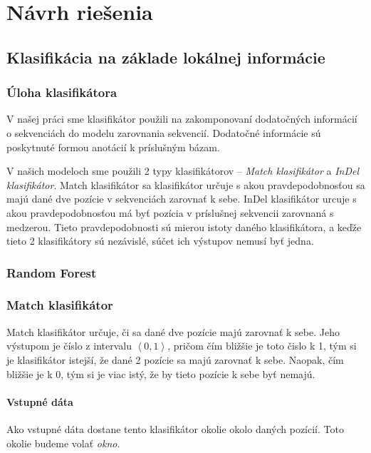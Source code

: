 \chapter{Návrh riešenia}
\section[Klasifikácia]{Klasifikácia na základe lokálnej informácie}

\subsection{Úloha klasifikátora}

V našej práci sme klasifikátor použili na zakomponovaní dodatočných informácií o sekvenciách do modelu zarovnania sekvencií. Dodatočné informácie sú poskytnuté formou anotácií k príslušným bázam.

V našich modeloch sme použili 2 typy klasifikátorov -- \textit{Match klasifikátor} a \textit{InDel klasifikátor}. Match klasifikátor sa klasifikátor určuje s akou pravdepodobnosťou sa majú dané dve pozície v sekvenciách zarovnať k sebe. InDel klasifikátor urcuje s akou pravdepodobnosťou má byť pozícia v príslušnej sekvencii zarovnaná s medzerou. Tieto pravdepodobnosti sú mierou istoty daného klasifikátora, a keďže tieto 2 klasifikátory sú nezávislé, súčet ich výstupov nemusí byť jedna.

\subsection{Random Forest}

\subsection{Match klasifikátor}

Match klasifikátor určuje, či sa dané dve pozície majú zarovnať k sebe. Jeho výstupom je číslo z intervalu $\left<0,1\right>$, pričom čím bližšie je toto čislo k 1, tým si je klasifikátor istejší, že dané 2 pozície sa majú zarovnať k sebe. Naopak, čím bližšie je k 0, tým si je viac istý, že by tieto pozície k sebe byť nemajú.

\subsubsection{Vstupné dáta}

Ako vstupné dáta dostane tento klasifikátor okolie okolo daných pozícií. Toto okolie budeme volať \textit{okno}.

